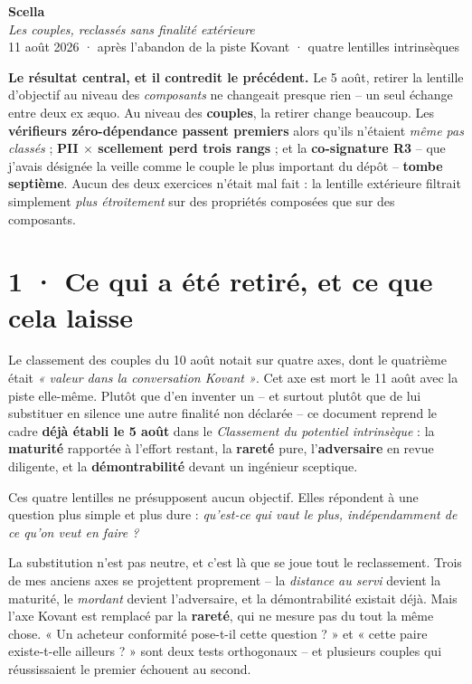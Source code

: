 \documentclass[10pt]{article}
\newcommand{\x}{$\times$}
\begin{document}
\begin{center}
{\Huge\bfseries\color{navy} Scella}\\[4pt]
{\large\color{grey}\itshape Les couples, reclassés sans finalité extérieure}\\[4pt]
{\small\color{grey} 11 août 2026 \; · \; après l'abandon de la piste Kovant \; · \; quatre lentilles intrinsèques}
\end{center}
\vspace{2pt}

\begin{these}
\textbf{Le résultat central, et il contredit le précédent.} Le 5 août, retirer la lentille d'objectif
au niveau des \emph{composants} ne changeait presque rien -- un seul échange entre deux ex \ae quo. Au
niveau des \textbf{couples}, la retirer change beaucoup. Les \textbf{vérifieurs zéro-dépendance
passent premiers} alors qu'ils n'étaient \emph{même pas classés} ; \textbf{PII \x{} scellement perd
trois rangs} ; et la \textbf{co-signature R3} -- que j'avais désignée la veille comme le couple le plus
important du dépôt -- \textbf{tombe septième}. Aucun des deux exercices n'était mal fait : la lentille
extérieure filtrait simplement \emph{plus étroitement} sur des propriétés composées que sur des
composants.
\end{these}

\section{1 · Ce qui a été retiré, et ce que cela laisse}

Le classement des couples du 10 août notait sur quatre axes, dont le quatrième était \emph{« valeur
dans la conversation Kovant »}. Cet axe est mort le 11 août avec la piste elle-même. Plutôt que d'en
inventer un -- et surtout plutôt que de lui substituer en silence une autre finalité non déclarée --
ce document reprend le cadre \textbf{déjà établi le 5 août} dans le \emph{Classement du potentiel
intrinsèque} : la \textbf{maturité} rapportée à l'effort restant, la \textbf{rareté} pure,
l'\textbf{adversaire} en revue diligente, et la \textbf{démontrabilité} devant un ingénieur sceptique.

Ces quatre lentilles ne présupposent aucun objectif. Elles répondent à une question plus simple et
plus dure : \emph{qu'est-ce qui vaut le plus, indépendamment de ce qu'on veut en faire ?}

La substitution n'est pas neutre, et c'est là que se joue tout le reclassement. Trois de mes anciens
axes se projettent proprement -- la \emph{distance au servi} devient la maturité, le \emph{mordant}
devient l'adversaire, et la démontrabilité existait déjà. Mais l'axe Kovant est remplacé par la
\textbf{rareté}, qui ne mesure pas du tout la même chose. « Un acheteur conformité pose-t-il cette
question ? » et « cette paire existe-t-elle ailleurs ? » sont deux tests orthogonaux -- et plusieurs
couples qui réussissaient le premier échouent au second.
\end{document}
